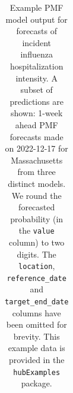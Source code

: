\documentclass[
]{article}
\begin{document}
\begin{longtable}[]{@{}
  >{\raggedright\arraybackslash}p{}
  >{\raggedright\arraybackslash}p{}
  >{\raggedleft\arraybackslash}p{}
  >{\raggedright\arraybackslash}p{}
  >{\raggedright\arraybackslash}p{}
  >{\raggedleft\arraybackslash}p{}@{}}

\caption{\label{tbl-example-forecasts-pmf}Example PMF model output for
forecasts of incident influenza hospitalization intensity. A subset of
predictions are shown: 1-week ahead PMF forecasts made on 2022-12-17 for
Massachusetts from three distinct models. We round the forecasted
probability (in the \texttt{value} column) to two digits. The
\texttt{location}, \texttt{reference\_date} and
\texttt{target\_end\_date} columns have been omitted for brevity. This
example data is provided in the \texttt{hubExamples} package.}

\tabularnewline


\end{longtable}
\end{document}
